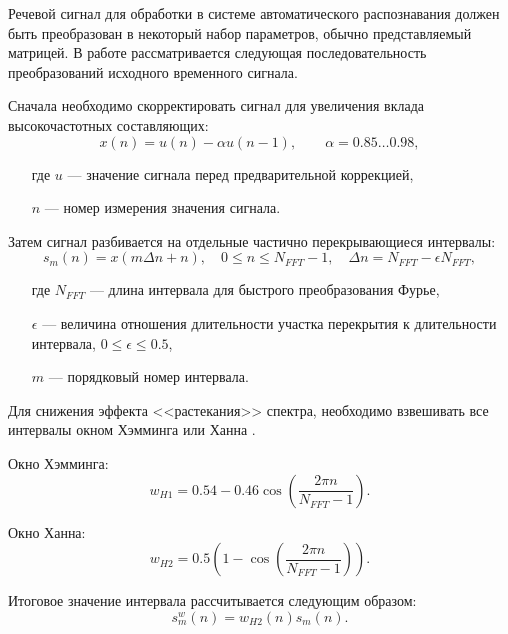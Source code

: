 Речевой сигнал для обработки в системе автоматического распознавания должен быть преобразован в некоторый набор параметров, обычно представляемый матрицей.
В работе рассматривается следующая последовательность преобразований исходного временного сигнала.

Сначала необходимо скорректировать сигнал для увеличения вклада высокочастотных составляющих:
\begin{equation}
x(n) = u(n) - \alpha u(n-1), \qquad \alpha = 0.85 \dots 0.98,
\end{equation}
\begin{itemize}[align=left,leftmargin=1.8em,itemindent=0pt,labelsep=0pt,labelwidth=1.8em]
	\item[где] $u$ --- значение сигнала перед предварительной коррекцией,
	\item[] $n$ --- номер измерения значения сигнала.
\end{itemize}

Затем сигнал разбивается на отдельные частично перекрывающиеся интервалы:
\begin{equation}
s_m(n) = x(m \Delta n + n),\quad
0 \le n \le N_{FFT} - 1,\quad
\Delta n = N_{FFT} - \epsilon N_{FFT},
\end{equation}
\begin{itemize}[align=left,leftmargin=1.8em,itemindent=0pt,labelsep=0pt,labelwidth=1.8em]
	\item[где] $N_{FFT}$ --- длина интервала для быстрого преобразования Фурье,
	\item[] $\epsilon$ --- величина отношения длительности участка перекрытия к длительности интервала, $0 \le \epsilon \le 0.5$,
	\item[] $m$ --- порядковый номер интервала.
\end{itemize}

Для снижения эффекта <<растекания>> спектра, необходимо взвешивать все интервалы окном Хэмминга или Ханна \cite{harris1978usage}.

Окно Хэмминга:
\begin{equation}
w_{H1} = 0.54 - 0.46 \cos \left(\frac{2 \pi n}{N_{FFT} - 1} \right).
\end{equation}

Окно Ханна:
\begin{equation}
w_{H2} = 0.5 \left(1 - \cos \left(\frac{2 \pi n}{N_{FFT} - 1} \right) \right).
\end{equation}

Итоговое значение интервала рассчитывается следующим образом:
\begin{equation}
s_m^{w}(n) = w_{H2}(n) s_m(n).
\end{equation}


